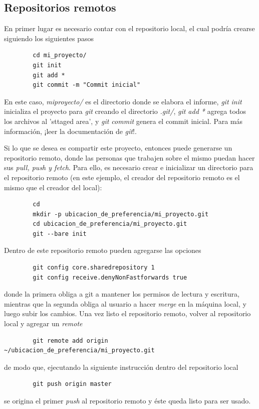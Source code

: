 \documentclass[a4paper,11pt,twoside]{MECOM}
\begin{document}
    \subsection*{Repositorios remotos}
    En primer lugar es necesario contar con el repositorio local, el cual podr\'ia crearse siguiendo los siguientes pasos    
    \begin{verbatim}
        cd mi_proyecto/
        git init
        git add *
        git commit -m "Commit inicial"
    \end{verbatim}
    En este caso, \emph{mi\textunderscore proyecto/} es el directorio donde se elabora el informe, \emph{git init} inicializa el proyecto para \emph{git} creando el directorio \emph{.git/}, \emph{git add *} agrega todos los archivos al 'sttaged area', y \emph{git commit} genera el commit inicial. Para m\'as informaci\'on, ¡leer la documentaci\'on de \emph{git}!.
    \par
    Si lo que se desea es compartir este proyecto, entonces puede generarse un repositorio remoto, donde las personas que trabajen sobre el mismo puedan hacer sus \emph{pull, push y fetch}. Para ello, es necesario crear e inicializar un directorio para el repositorio remoto (en este ejemplo, el creador del repositorio remoto es el mismo que el creador del local):
    \begin{verbatim}
        cd
        mkdir -p ubicacion_de_preferencia/mi_proyecto.git
        cd ubicacion_de_preferencia/mi_proyecto.git
        git --bare init
    \end{verbatim} 
    Dentro de este repositorio remoto pueden agregarse las opciones    
    \begin{verbatim}
        git config core.sharedrepository 1
        git config receive.denyNonFastforwards true
    \end{verbatim}
    donde la primera obliga a git a mantener los permisos de lectura y escritura, mientras que la segunda obliga al usuario a hacer \emph{merge} en la m\'aquina local, y luego subir los cambios. Una vez listo el repositorio remoto, volver al repositorio local y agregar un \emph{remote}
    \begin{verbatim}
        git remote add origin ~/ubicacion_de_preferencia/mi_proyecto.git
    \end{verbatim}
    de modo que, ejecutando la siguiente instrucci\'on dentro del repositorio local
    \begin{verbatim}
        git push origin master
    \end{verbatim}
    se origina el primer \emph{push} al repositorio remoto y \'este queda listo para ser usado.
\end{document}

